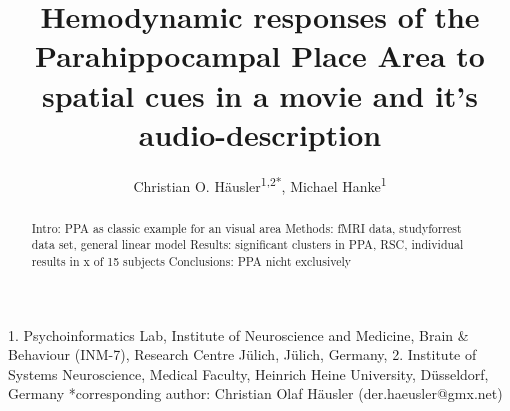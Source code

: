 \documentclass[english]{article}
\begin{document}
\title{Hemodynamic responses of the Parahippocampal Place Area to spatial cues in a movie and it's audio-description} 

\author{Christian O. Häusler\textsuperscript{1,2{*}}, Michael Hanke\textsuperscript{1}}

\maketitle
\thispagestyle{fancy}
1. Psychoinformatics Lab, Institute of Neuroscience and Medicine, Brain \& Behaviour (INM-7), Research Centre Jülich, Jülich, Germany, 
2. Institute of Systems Neuroscience, Medical Faculty, Heinrich Heine University, Düsseldorf, Germany 
{*}corresponding author: Christian Olaf Häusler (der.haeusler@gmx.net)

\begin{abstract}
Intro: PPA as classic example for an visual area
Methods: fMRI data, studyforrest data set, general linear model
Results: significant clusters in PPA, RSC, individual results in x of 15 subjects
Conclusions: PPA nicht exclusively 
\end{abstract}
\end{document}

